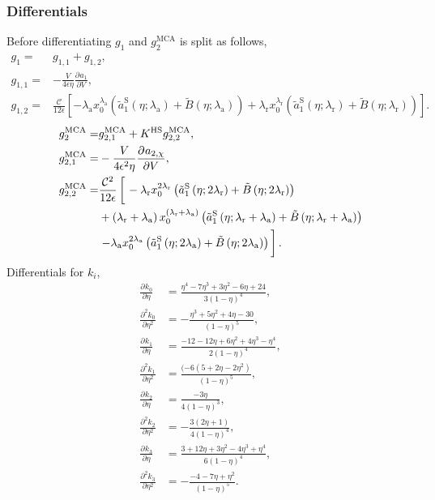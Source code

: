 \documentclass[english]{../thermomemo/thermomemo}
\newcommand*{\pd}[3][]{\frac{\partial^{#1}#2}{\partial{#3}^{#1}}}%
\newcommand*{\lb}{\left(}
\newcommand*{\rb}{\right)}
\newcommand{\mca}{\text{MCA}\xspace}
\newcommand{\hs}{\text{HS}\xspace}
\newcommand{\lama}{\ensuremath{{\lambda_{\text{a}}}}\xspace}
\newcommand{\lamr}{\ensuremath{{\lambda_{\text{r}}}}\xspace}
\newcommand{\aSt}{\ensuremath{\tilde{a}_{1}^{\text{S}}}\xspace}
\newcommand{\Bt}{\ensuremath{\tilde{B}}\xspace}
\begin{document}
\subsubsection{Differentials}
Before differentiating $g_1$ and $g_2^\mca$ is split as follows,
\begin{align}
  \label{eq:g_1_split}
  g_1 =& g_{1,1} + g_{1,2},\\
  g_{1,1} =& -\frac{V}{4 \epsilon \eta}\pd{a_1}{V},\\
  g_{1,2} =& \frac{\mathcal{C}}{12 \epsilon} \left[
    -  \lama x_0^\lama \lb\aSt\lb \eta; \lama\rb + \Bt\lb\eta;\lama \rb \rb
  + \lamr x_0^\lamr \lb \aSt\lb \eta; \lamr\rb + \Bt\lb\eta;\lamr \rb\rb\right].
\end{align}
\begin{align}
  \label{eq:g_2_split}
  g_2^\mca =& g_{2,1}^\mca + K^\hs g_{2,2}^\mca,\\
  g_{2,1}^\mca =& -\frac{V}{4 \epsilon^2 \eta}\pd{a_{2,\chi}}{V},\\
  g_{2,2}^\mca =& \frac{\mathcal{C}^2 }{12 \epsilon} \left[ \vphantom{\frac{\mathcal{C}^2 }{12 \epsilon}}  \right. - \lamr x_0^{2\lamr} \lb\aSt\lb \eta; 2\lamr\rb + \Bt\lb\eta;2\lamr \rb\rb \vphantom{\frac{\mathcal{C}^2 }{12 \epsilon}} \nonumber \\ & + {\lb\lamr + \lama\rb x_0^{\lb\lamr + \lama\rb} \lb\aSt\lb \eta; \lamr + \lama\rb + \Bt\lb\eta;\lamr + \lama \rb\rb} \nonumber \\
 &\left. - \lama x_0^{2\lama} \lb\aSt\lb \eta; 2\lama\rb + \Bt\lb\eta;2\lama \rb\rb \vphantom{\frac{ \mathcal{C}^2 }{12 \epsilon}} \right].
\end{align}
Differentials for $k_i$,
\begin{align}
  \label{eq:k_0_diff}
  \pd{k_0}{\eta} &=  \frac{\eta^4 - 7 \eta^3 + 3 \eta^2 -6\eta + 24}{3 \lb 1- \eta\rb^4},\\
  \pd[2]{k_0}{\eta} &= - \frac{\eta^3 + 5 \eta^2 + 4\eta - 30}{\lb 1- \eta\rb^5},\\
  \label{eq:k_1_diff}
  \pd{k_1}{\eta} &= \frac{ -12 - 12 \eta + 6 \eta^2 + 4 \eta^3 - \eta^4}{2 \lb 1- \eta\rb^4},\\
  \pd[2]{k_1}{\eta} &= \frac{ (-6 \lb 5 + 2 \eta - 2 \eta^2\rb}{\lb 1- \eta\rb^5},\\
  \label{eq:k_2_diff}
  \pd{k_2}{\eta} &= \frac{-3 \eta}{4 \lb 1- \eta\rb^3},\\
  \pd[2]{k_2}{\eta} &= -\frac{3\lb 2\eta + 1 \rb}{4 \lb 1- \eta\rb^4},\\
  \label{eq:k_3_diff}
  \pd{k_3}{\eta} &= \frac{3 + 12 \eta + 3 \eta^2 - 4 \eta^3 + \eta^4}{6 \lb 1- \eta\rb^4},\\
  \pd[2]{k_3}{\eta} &= -\frac{-4 - 7\eta + \eta^2}{\lb 1- \eta\rb^5}.
\end{align}
\end{document}
